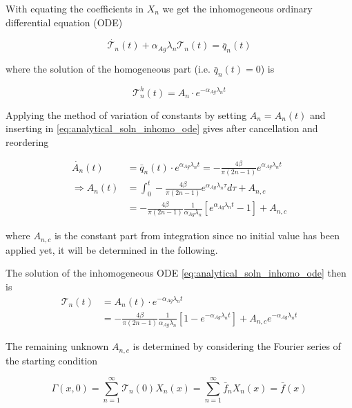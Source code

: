 \documentclass{scrartcl}[12pt, halfparskip]
\numberwithin{equation}{section}
\numberwithin{figure}{section}
\numberwithin{table}{section}
\begin{document}
With equating the coefficients in $X_n$ we get the inhomogeneous ordinary differential equation (ODE)

\begin{equation}
	\dot{\mathcal{T}_n}(t) + \alpha_{Ag} \lambda_n \mathcal{T}_n(t) = \bar{q}_n(t)
	\label{eq:analytical_soln_inhomo_ode}
\end{equation}

where the solution of the homogeneous part (i.e. $\bar{q}_n(t) = 0$) is

\begin{equation}
	\mathcal{T}_n^h(t) = A_n \cdot e^{-\alpha_{Ag} \lambda_n t}
\end{equation}

Applying the method of variation of constants by setting $A_n = A_n(t)$ and inserting in \cref{eq:analytical_soln_inhomo_ode} gives after cancellation and reordering

\begin{align}
	\dot{A_n}(t) & = \bar{q}_n(t) \cdot e^{\alpha_{Ag} \lambda_n t} = -\frac{4 \beta}{\pi (2n - 1)} e^{\alpha_{Ag} \lambda_n t} \\
	\Rightarrow A_n(t) & = \int_{0}^{t} -\frac{4 \beta}{\pi (2n - 1)} e^{\alpha_{Ag} \lambda_n \tau} d \tau + A_{n,c} \\
	& = -\frac{4 \beta}{\pi (2n - 1)} \frac{1}{\alpha_{Ag} \lambda_n} \left[ e^{\alpha_{Ag} \lambda_n t} - 1 \right] + A_{n,c}
\end{align}

where $A_{n,c}$ is the constant part from integration since no initial value has been applied yet, it will be determined in the following.

The solution of the inhomogeneous ODE \cref{eq:analytical_soln_inhomo_ode} then is
\begin{align}
	\mathcal{T}_n(t) & = A_n(t) \cdot e^{-\alpha_{Ag} \lambda_n t}  \\
	& = -\frac{4 \beta}{\pi (2n - 1)} \frac{1}{\alpha_{Ag} \lambda_n} \left[1 - e^{-\alpha_{Ag} \lambda_n t} \right] + A_{n,c} e^{- \alpha_{Ag} \lambda_n t} \nonumber
\end{align}

The remaining unknown $A_{n,c}$ is determined by considering the Fourier series of the starting condition

\begin{equation}
	\Gamma(x,0) = \sum_{n=1}^{\infty} \mathcal{T}_n(0) X_n(x) = \sum_{n=1}^{\infty} \bar{f}_n X_n(x) = \bar{f}(x)
\end{equation}
\end{document}
